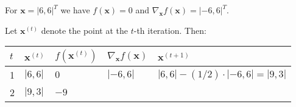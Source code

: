 \documentclass[
  a4paper,
]{article}
\begin{document}
For \(\textbf{x}=|6,6|^T\) we have \(f(\textbf{x})=0\) and
\(\nabla_{\textbf{x}}f(\textbf{x})=|-6,6|^T\).

Let \(\textbf{x}^{(t)}\) denote the point at the \(t\)-th iteration.
Then:

\begin{longtable}[]{@{}lllll@{}}
\toprule
\begin{minipage}[b]{0.17\columnwidth}\raggedright
\(t\)\strut
\end{minipage} & \begin{minipage}[b]{0.17\columnwidth}\raggedright
\(\textbf{x}^{(t)}\)\strut
\end{minipage} & \begin{minipage}[b]{0.17\columnwidth}\raggedright
\(f(\textbf{x}^{(t)})\)\strut
\end{minipage} & \begin{minipage}[b]{0.17\columnwidth}\raggedright
\(\nabla_{\textbf{x}}f(\textbf{x})\)\strut
\end{minipage} & \begin{minipage}[b]{0.17\columnwidth}\raggedright
\(\textbf{x}^{(t+1)}\)\strut
\end{minipage}\tabularnewline
\midrule
\endhead
\begin{minipage}[t]{0.17\columnwidth}\raggedright
1\strut
\end{minipage} & \begin{minipage}[t]{0.17\columnwidth}\raggedright
\(|6,6|\)\strut
\end{minipage} & \begin{minipage}[t]{0.17\columnwidth}\raggedright
\(0\)\strut
\end{minipage} & \begin{minipage}[t]{0.17\columnwidth}\raggedright
\(|-6,6|\)\strut
\end{minipage} & \begin{minipage}[t]{0.17\columnwidth}\raggedright
\(|6,6|-(1/2)\cdot|-6,6|=|9,3|\)\strut
\end{minipage}\tabularnewline
\begin{minipage}[t]{0.17\columnwidth}\raggedright
2\strut
\end{minipage} & \begin{minipage}[t]{0.17\columnwidth}\raggedright
\(|9,3|\)\strut
\end{minipage} & \begin{minipage}[t]{0.17\columnwidth}\raggedright
\(-9\)\strut
\end{minipage} & \begin{minipage}[t]{0.17\columnwidth}\raggedright

\end{minipage}
\end{longtable}
\end{document}
